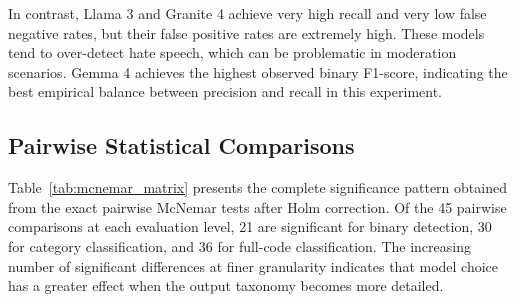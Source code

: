 \documentclass[a4paper]{article}
\begin{document}
In contrast, Llama 3 and Granite 4 achieve very high recall and very low false negative rates, but their false positive rates are extremely high. These models tend to over-detect hate speech, which can be problematic in moderation scenarios. Gemma 4 achieves the highest observed binary F1-score, indicating the best empirical balance between precision and recall in this experiment.

\subsection{Pairwise Statistical Comparisons}

Table~\ref{tab:mcnemar_matrix} presents the complete significance pattern obtained from the exact pairwise McNemar tests after Holm correction. Of the 45 pairwise comparisons at each evaluation level, 21 are significant for binary detection, 30 for category classification, and 36 for full-code classification. The increasing number of significant differences at finer granularity indicates that model choice has a greater effect when the output taxonomy becomes more detailed.
\end{document}
